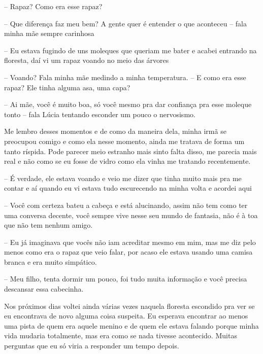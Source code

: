 -- Rapaz? Como era esse rapaz?

-- Que diferença faz meu bem? A gente quer é entender o que aconteceu -- fala minha mãe sempre carinhosa

-- Eu estava fugindo de uns moleques que queriam me bater e acabei entrando na floresta, daí vi um rapaz voando no meio das árvores

-- Voando? Fala minha mãe medindo a minha temperatura. -- E como era esse rapaz? Ele tinha alguma asa, uma capa?

-- Ai mãe, você é muito boa, só você mesmo pra dar confiança pra esse moleque tonto -- fala Lúcia tentando esconder um pouco o nervosismo.

Me lembro desses momentos e de como da maneira dela, minha irmã se preocupou comigo e como ela nesse momento, ainda me tratava de forma um tanto ríspida. Pode parecer meio estranho mais sinto falta disso, me parecia mais real e não como se eu fosse de vidro como ela vinha me tratando recentemente.

-- É verdade, ele estava voando e veio me dizer que tinha muito mais pra me contar e aí quando eu vi estava tudo escurecendo na minha volta e acordei aqui

-- Você com certeza bateu a cabeça e está alucinando, assim não tem como ter uma conversa decente, você sempre vive nesse seu mundo de fantasia, não é à toa que não tem nenhum amigo.

-- Eu já imaginava que vocês não iam acreditar mesmo em mim, mas me diz pelo menos como era o rapaz que veio falar, por acaso ele estava usando uma camisa branca e era muito simpático.

-- Meu filho, tenta dormir um pouco, foi tudo muita informação e você precisa descansar essa cabecinha.


Nos próximos dias voltei ainda várias vezes naquela floresta escondido pra ver se eu encontrava de novo alguma coisa suspeita. Eu esperava encontrar ao menos uma pista de quem era aquele menino e de quem ele estava falando porque minha vida mudaria totalmente, mas era como se nada tivesse acontecido. Muitas perguntas que eu só viria a responder um tempo depois.




